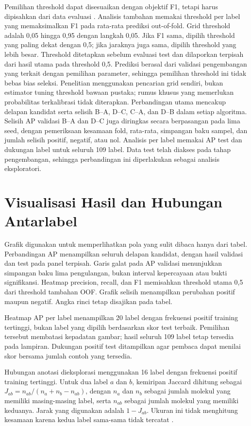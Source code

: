 Pemilihan threshold dapat disesuaikan dengan objektif F1, tetapi harus dipisahkan dari data evaluasi \cite{lipton2014,sklearnthreshold2026}. Analisis tambahan memakai threshold per label yang memaksimalkan F1 pada rata-rata prediksi out-of-fold. Grid threshold adalah 0,05 hingga 0,95 dengan langkah 0,05. Jika F1 sama, dipilih threshold yang paling dekat dengan 0,5; jika jaraknya juga sama, dipilih threshold yang lebih besar. Threshold ditetapkan sebelum evaluasi test dan dilaporkan terpisah dari hasil utama pada threshold 0,5. Prediksi berasal dari validasi pengembangan yang terkait dengan pemilihan parameter, sehingga pemilihan threshold ini tidak bebas bias seleksi. Penelitian menggunakan pencarian grid sendiri, bukan estimator tuning threshold bawaan pustaka; rumus khusus yang memerlukan probabilitas terkalibrasi tidak diterapkan. Perbandingan utama mencakup delapan kandidat serta selisih B--A, D--C, C--A, dan D--B dalam setiap algoritma. Selisih AP validasi B--A dan D--C juga diringkas secara berpasangan pada lima seed, dengan pemeriksaan kesamaan fold, rata-rata, simpangan baku sampel, dan jumlah selisih positif, negatif, atau nol. Analisis per label memakai AP test dan dukungan label untuk seluruh 109 label. Data test telah diakses pada tahap pengembangan, sehingga perbandingan ini diperlakukan sebagai analisis eksploratori.

\section{Visualisasi Hasil dan Hubungan Antarlabel}
Grafik digunakan untuk memperlihatkan pola yang sulit dibaca hanya dari tabel. Perbandingan AP menampilkan seluruh delapan kandidat, dengan hasil validasi dan test pada panel terpisah. Garis galat pada AP validasi menunjukkan simpangan baku lima pengulangan, bukan interval kepercayaan atau bukti signifikansi. Heatmap precision, recall, dan F1 memisahkan threshold utama 0,5 dari threshold tambahan OOF. Grafik selisih menampilkan perubahan positif maupun negatif. Angka rinci tetap disajikan pada tabel.

Heatmap AP per label menampilkan 20 label dengan frekuensi positif training tertinggi, bukan label yang dipilih berdasarkan skor test terbaik. Pemilihan tersebut membatasi kepadatan gambar; hasil seluruh 109 label tetap tersedia pada lampiran. Dukungan positif test ditampilkan agar pembaca dapat menilai skor bersama jumlah contoh yang tersedia.

Hubungan anotasi dieksplorasi menggunakan 16 label dengan frekuensi positif training tertinggi. Untuk dua label $a$ dan $b$, kemiripan Jaccard dihitung sebagai $J_{ab}=n_{ab}/(n_a+n_b-n_{ab})$, dengan $n_a$ dan $n_b$ sebagai jumlah molekul yang memiliki masing-masing label, serta $n_{ab}$ sebagai jumlah molekul yang memiliki keduanya. Jarak yang digunakan adalah $1-J_{ab}$. Ukuran ini tidak menghitung kesamaan karena kedua label sama-sama tidak tercatat \cite{scipyjaccard2026}.

